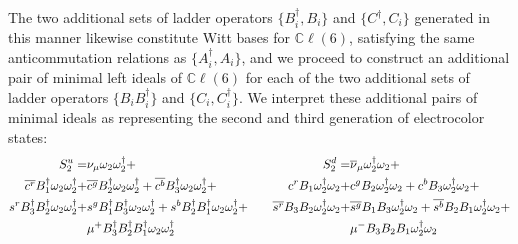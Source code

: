 \documentclass{article}
\newcommand{\bb}[1]{\mathbb{#1}}
\begin{document}
The two additional sets of ladder operators $\{B_i^{\dagger},B_i\}$ and $\{C^{\dagger},C_i\}$ generated in this manner likewise constitute Witt bases for $\bb{C}\ell(6)$, satisfying the same anticommutation relations as $\{A_i^{\dagger},A_i\}$, and we proceed to construct an additional pair of minimal left ideals of $\bb{C}\ell(6)$ for each of the two additional sets of ladder operators $\{B_iB_i^{\dagger}\}$ and $\{C_i,C_i^{\dagger}\}$. We interpret these additional pairs of minimal ideals as representing the second and third generation of electrocolor states:
\begin{equation} \notag
 \begin{split}
     S_2^u=&{\nu_{\mu}}\omega_2\omega_2^\dagger + \\  \overline{c^r}{B_1^\dagger}\omega_2\omega_2^\dagger + &\overline{c^g}{B_2^\dagger}\omega_2\omega_2^\dagger + \overline{c^b}{B_3^\dagger}\omega_2\omega_2^\dagger + \\ s^r{B_3^\dagger}{B_2^\dagger}\omega_2\omega_2^\dagger + &s^g{B_1^\dagger}{B_3^\dagger}\omega_2\omega_2^\dagger + s^b{B_2^\dagger}{B_1^\dagger}\omega_2\omega_2^\dagger + \\ &\mu^+{B_3^\dagger}{B_2^\dagger}{B_1^\dagger}\omega_2\omega_2^\dagger
\end{split}
\qquad 
\begin{split}
     S_2^d=&{\overline{\nu}_{\mu}}\omega_2^\dagger\omega_2 + \\ {c}^r{B_1}\omega_2^\dagger\omega_2 + &{c}^g{B_2}\omega_2^\dagger\omega_2 +  {c}^b{B_3}\omega_2^\dagger\omega_2 + \\ \overline{s^r}{B_3}{B_2}\omega_2^\dagger\omega_2 + &\overline{s^g}{B_1}{B_3}\omega_2^\dagger\omega_2 + \overline{s^b}{B_2}{B_1}\omega_2^\dagger\omega_2 + \\ &\mu^-{B_3}{B_2}{B_1}\omega_2^\dagger\omega_2
\end{split}
\end{equation}
\end{document}
